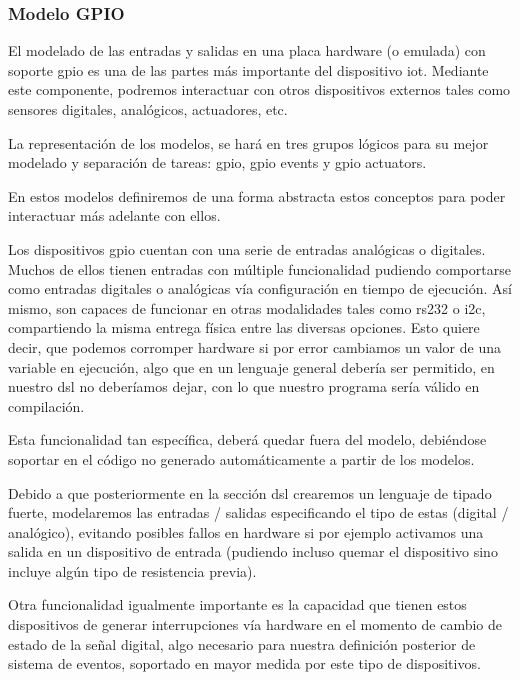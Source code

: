 \subsubsection{Modelo GPIO}

El modelado de las entradas y salidas en una placa hardware (o emulada) con soporte \gls{gpio} es una de las partes más importante del dispositivo \gls{iot}. Mediante este componente, podremos interactuar con otros dispositivos externos tales como sensores digitales, analógicos, actuadores, etc.

La representación de los modelos, se hará en tres grupos lógicos para su mejor modelado y separación de tareas:  gpio, gpio events y gpio actuators.



En estos modelos definiremos de una forma abstracta estos conceptos para poder interactuar más adelante con ellos.

Los dispositivos \gls{gpio} cuentan con una serie de entradas analógicas o digitales. Muchos de ellos tienen entradas con múltiple funcionalidad pudiendo comportarse como entradas digitales o analógicas vía configuración en tiempo de ejecución. Así mismo, son capaces de funcionar en otras modalidades tales como \gls{rs232} o \gls{i2c}, compartiendo la misma entrega física entre las diversas opciones. Esto quiere decir, que podemos corromper hardware si por error cambiamos un valor de una variable en ejecución, algo que en un lenguaje general debería ser permitido, en nuestro \gls{dsl} no deberíamos dejar, con lo que nuestro programa sería válido en compilación.

Esta funcionalidad tan específica, deberá quedar fuera del modelo, debiéndose soportar en el código no generado automáticamente a partir de los modelos.

Debido a que posteriormente en la sección \gls{dsl} crearemos un lenguaje de tipado fuerte, modelaremos las entradas / salidas especificando el tipo de estas (digital / analógico), evitando posibles fallos en hardware si por ejemplo activamos una salida en un dispositivo de entrada (pudiendo incluso quemar el dispositivo sino incluye algún tipo de resistencia previa).

Otra funcionalidad igualmente importante es la capacidad que tienen estos dispositivos de generar interrupciones vía hardware en el momento de cambio de estado de la señal digital, algo necesario para nuestra definición posterior de sistema de eventos, soportado en mayor medida por este tipo de dispositivos.

